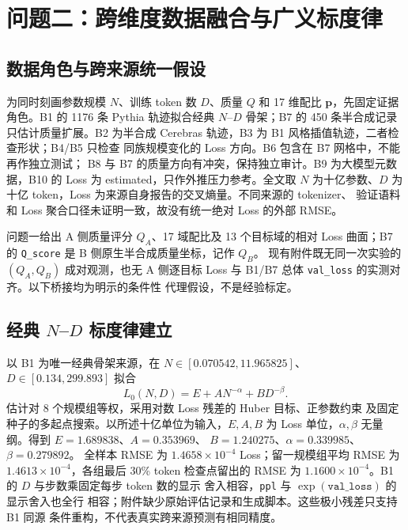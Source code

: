 \section{问题二：跨维度数据融合与广义标度律}

\subsection{数据角色与跨来源统一假设}

为同时刻画参数规模 $N$、训练 token 数 $D$、质量 $Q$ 和 17 维配比
$\boldsymbol p$，先固定证据角色。B1 的 1176 条 Pythia 轨迹拟合经典
$N$--$D$ 骨架；B7 的 450 条半合成记录只估计质量扩展。B2 为半合成
Cerebras 轨迹，B3 为 B1 风格插值轨迹，二者检查形状；B4/B5 只检查
同族规模变化的 Loss 方向。B6 包含在 B7 网格中，不能再作独立测试；
B8 与 B7 的质量方向有冲突，保持独立审计。B9 为大模型元数据，B10
的 Loss 为 estimated，只作外推压力参考。全文取 $N$ 为十亿参数、$D$
为十亿 token，Loss 为来源自身报告的交叉熵量。不同来源的 tokenizer、
验证语料和 Loss 聚合口径未证明一致，故没有统一绝对 Loss 的外部 RMSE。

问题一给出 A 侧质量评分 $Q_A$、17 域配比及 13 个目标域的相对 Loss
曲面；B7 的 \texttt{Q\_score} 是 B 侧原生半合成质量坐标，记作 $Q_B$。
现有附件既无同一次实验的 $(Q_A,Q_B)$ 成对观测，也无 A 侧逐目标 Loss
与 B1/B7 总体 \texttt{val\_loss} 的实测对齐。以下桥接均为明示的条件性
代理假设，不是经验标定。

\subsection{经典 $N$--$D$ 标度律建立}

以 B1 为唯一经典骨架来源，在 $N\in[0.070542,11.965825]$、
$D\in[0.134,299.893]$ 拟合
\begin{equation}\label{eq:cyj-b1}
L_0(N,D)=E+A N^{-\alpha}+B D^{-\beta}.
\end{equation}
估计对 8 个规模组等权，采用对数 Loss 残差的 Huber 目标、正参数约束
及固定种子的多起点搜索。以所述十亿单位为输入，$E,A,B$ 为 Loss
单位，$\alpha,\beta$ 无量纲。得到 $E=1.689838$、$A=0.353969$、
$B=1.240275$、$\alpha=0.339985$、$\beta=0.279892$。
全样本 RMSE 为 $1.4658\times10^{-4}$ Loss；留一规模组平均 RMSE 为
$1.4613\times10^{-4}$，各组最后 30\% token 检查点留出的 RMSE 为
$1.1600\times10^{-4}$。B1 的 $D$ 与步数乘固定每步 token 数的显示
舍入相容，\texttt{ppl} 与 $\exp(\texttt{val\_loss})$ 的显示舍入也全行
相容；附件缺少原始评估记录和生成脚本。这些极小残差只支持 B1 同源
条件重构，不代表真实跨来源预测有相同精度。

